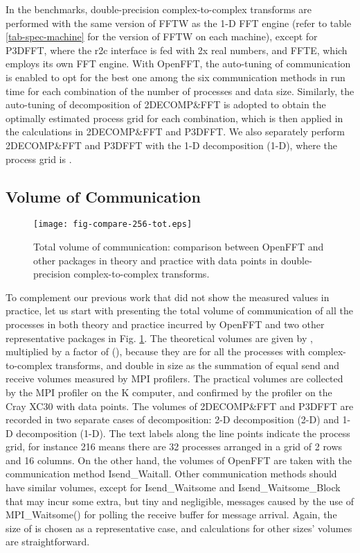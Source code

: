 In the benchmarks, double-precision complex-to-complex transforms are performed with the same version of FFTW \cite{FFTW} as the 1-D FFT engine (refer to table \ref{tab-spec-machine} for the version of FFTW on each machine), except for P3DFFT, where the r2c interface is fed with 2x real numbers, and FFTE, which employs its own FFT engine. With OpenFFT, the auto-tuning of communication is enabled to opt for the best one among the six communication methods in run time for each combination of the number of processes and data size. Similarly, the auto-tuning of decomposition of 2DECOMP\&FFT is adopted to obtain the optimally estimated process grid for each combination, which is then applied in the calculations in 2DECOMP\&FFT and P3DFFT. We also separately perform 2DECOMP\&FFT and P3DFFT with the 1-D decomposition (1-D), where the process grid is . 

\subsection{Volume of Communication}

\begin{figure}[b]
\begin{center}
\texttt{[image: fig-compare-256-tot.eps]}
\end{center}
\caption{Total volume of communication: comparison between OpenFFT and other packages in theory and practice with  data points in double-precision complex-to-complex transforms.}
\label{fig-compare-volume}
\end{figure}

To complement our previous work \cite{Duy2014153} that did not show the measured values in practice, let us start with presenting the total volume of communication of all the processes in both theory and practice incurred by OpenFFT and two other representative packages in Fig. \ref{fig-compare-volume}. The theoretical volumes are given by \cite{Duy2014153}, multiplied by a factor of (), because they are for all the processes with complex-to-complex transforms, and double in size as the summation of equal send and receive volumes measured by MPI profilers. The practical volumes are collected by the MPI profiler on the K computer, and confirmed by the profiler on the Cray XC30 with  data points. The volumes of 2DECOMP\&FFT and P3DFFT are recorded in two separate cases of decomposition: 2-D decomposition (2-D) and 1-D decomposition (1-D). The text labels along the line points indicate the process grid, for instance 216 means there are 32 processes arranged in a grid of 2 rows and 16 columns. On the other hand, the volumes of OpenFFT are taken with the communication method Isend\_Waitall. Other communication methods should have similar volumes, except for Isend\_Waitsome and Isend\_Waitsome\_Block that may incur some extra, but tiny and negligible, messages caused by the use of MPI\_Waitsome() for polling the receive buffer for message arrival. Again, the size of  is chosen as a representative case, and calculations for other sizes' volumes are straightforward. 

